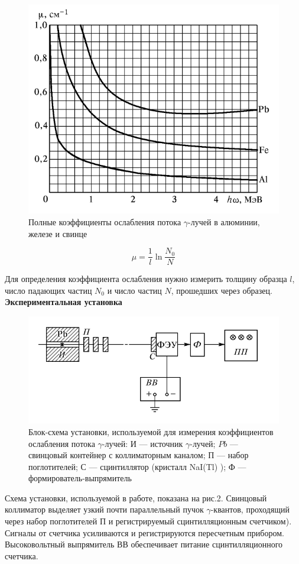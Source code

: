 \documentclass[a4paper, 12pt]{article}%
\begin{document}
	\begin{figure}[h!]
		\centering
		\includegraphics[width=0.6\linewidth]{1}
		\caption{Полные коэффициенты ослабления потока $\gamma$-лучей в алюминии, железе и свинце}
		\label{ris mu}
	\end{figure}
	
	\begin{equation}\label{mu}
		\mu = \dfrac{1}{l} \ln{\dfrac{N_0}{N}}
	\end{equation}
	
	Для определения коэффициента ослабления нужно измерить толщину образца $ l $, число падающих частиц $ N_0 $ и число
	частиц $ N $, прошедших через образец.\\
	
	\textbf{Экспериментальная установка}\\
	
	\begin{figure}[h!]
		\centering
		\includegraphics[width=0.7\linewidth]{2}
		\caption{Блок-схема установки, используемой для измерения коэффициентов ослабления потока $\gamma$-лучей: И --- источник $\gamma$-лучей; $ Pb $ --- свинцовый контейнер с коллиматорным каналом; П --- набор поглотителей; С --- сцинтиллятор (кристалл
			NaI(Tl) ); Ф --- формирователь-выпрямитель}
	\end{figure}
	
	Схема установки, используемой в работе, показана на рис.2. Свинцовый коллиматор выделяет узкий почти параллельный пучок $\gamma$-квантов, проходящий через набор поглотителей П и регистрируемый сцинтилляционным счетчиком). Сигналы от счетчика усиливаются и регистрируются пересчетным прибором. Высоковольтный выпрямитель ВВ обеспечивает питание сцинтилляционного счетчика.
	
\end{document}

